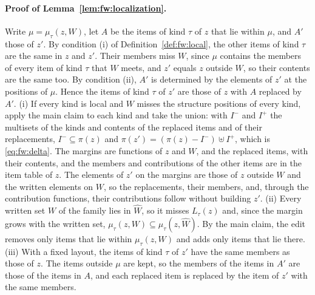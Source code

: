 \paragraph{Proof of Lemma~\ref{lem:fw:localization}.}
Write $\mu = \mu_\tau(z, W)$, let $A$ be the items of kind $\tau$ of $z$ that lie within $\mu$, and $A'$ those of $z'$.
By condition (i) of Definition~\ref{def:fw:local}, the other items of kind $\tau$ are the same in $z$ and $z'$. Their
members miss $W$, since $\mu$ contains the members of every item of kind $\tau$ that $W$ meets, and $z'$ equals $z$
outside $W$, so their contents are the same too. By condition (ii), $A'$ is determined by the elements of $z'$ at the
positions of $\mu$. Hence the items of kind $\tau$ of $z'$ are those of $z$ with $A$ replaced by $A'$.
(i) If every kind is local and $W$ misses the structure positions of every kind, apply the main claim to each kind and
take the union: with $I^-$ and $I^+$ the multisets of the kinds and contents of the replaced items and of their
replacements, $I^- \subseteq \pi(z)$ and $\pi(z') = (\pi(z) - I^-) \uplus I^+$, which is \eqref{eq:fw:delta}. The
margins are functions of $z$ and $W$, and the replaced items, with their contents, and the members and contributions
of the other items are in the item table of $z$. The elements of $z'$ on the margins are those of $z$ outside $W$ and
the written elements on $W$, so the replacements, their members, and, through the contribution functions, their
contributions follow without building $z'$.
(ii) Every written set $W$ of the family lies in $\hat{W}$, so it misses $L_\tau(z)$ and, since the margin grows with
the written set, $\mu_\tau(z, W) \subseteq \mu_\tau(z, \hat{W})$. By the main claim, the edit removes only items that
lie within $\mu_\tau(z, W)$ and adds only items that lie there.
(iii) With a fixed layout, the items of kind $\tau$ of $z'$ have the same members as those of $z$. The items outside
$\mu$ are kept, so the members of the items in $A'$ are those of the items in $A$, and each replaced item is replaced
by the item of $z'$ with the same members.

